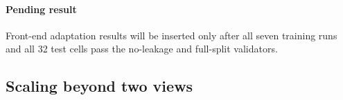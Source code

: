 \documentclass[preprint,12pt]{elsarticle}
\providecommand{\DIFaddend}{} %
\providecommand{\DIFdelbegin}{} %
\begin{document}
{}{%
\paragraph{Pending result} Front-end adaptation results will be inserted only after all seven training runs and all 32 test cells pass the no-leakage and full-split validators.
}
\DIFaddend 

\FloatBarrier
\subsection{Scaling beyond two views}

\DIFdelbegin %
\end{document}
